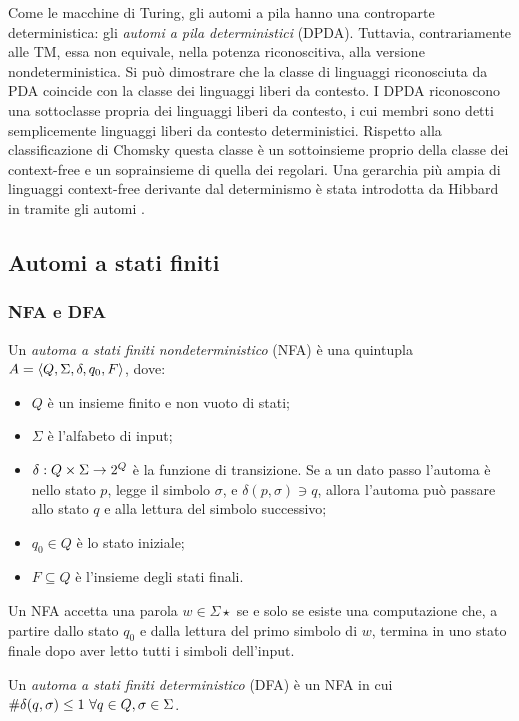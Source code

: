 Come le macchine di Turing, gli automi a pila hanno una controparte deterministica: gli \emph{automi a pila deterministici} (DPDA). Tuttavia, contrariamente alle TM, essa non equivale, nella potenza riconoscitiva, alla versione nondeterministica. Si può dimostrare che la classe di linguaggi riconosciuta da PDA coincide con la classe dei linguaggi liberi da contesto. I DPDA riconoscono una sottoclasse propria dei linguaggi liberi da contesto, i cui membri sono detti semplicemente linguaggi liberi da contesto deterministici. Rispetto alla classificazione di Chomsky questa classe è un sottoinsieme proprio della classe dei context-free e un soprainsieme di quella dei regolari. Una gerarchia più ampia di linguaggi context-free derivante dal determinismo è stata introdotta da Hibbard in \cite{Hibbard:67:CFdet} tramite gli automi .


\subsection{Automi a stati finiti}\label{subs:prel:NFA}

\subsubsection{NFA e DFA}
\begin{defin}
	Un \emph{automa a stati finiti nondeterministico} (NFA) è una quintupla $A=\langle Q,\Sigma,\delta,q_0,F \rangle$, dove:
	\begin{itemize}
		\item $Q$ è un insieme finito e non vuoto di stati;
		\item $\Sigma$ è l'alfabeto di input;
		\item $\delta:Q\times\Sigma\to2^{Q}$ è la funzione di transizione. Se a un dato passo l'automa è nello stato $p$, legge il simbolo $\sigma$, e $\delta(p,\sigma)\ni q$, allora l'automa può passare allo stato $q$ e alla lettura del simbolo successivo;
		\item $q_0\in Q$ è lo stato iniziale;
		\item $F\subseteq Q$ è l'insieme degli stati finali.
	\end{itemize}
	Un NFA accetta una parola $w\in\Sigma\star$ se e solo se esiste una computazione che, a partire dallo stato $q_0$ e dalla lettura del primo simbolo di $w$, termina in uno stato finale dopo aver letto tutti i simboli dell'input.
\end{defin}
\begin{defin}
	Un \emph{automa a stati finiti deterministico} (DFA) è un NFA in cui $\# \delta(q,\sigma)\leq 1 ~ \forall q\in Q,\sigma\in\Sigma$.
\end{defin}

